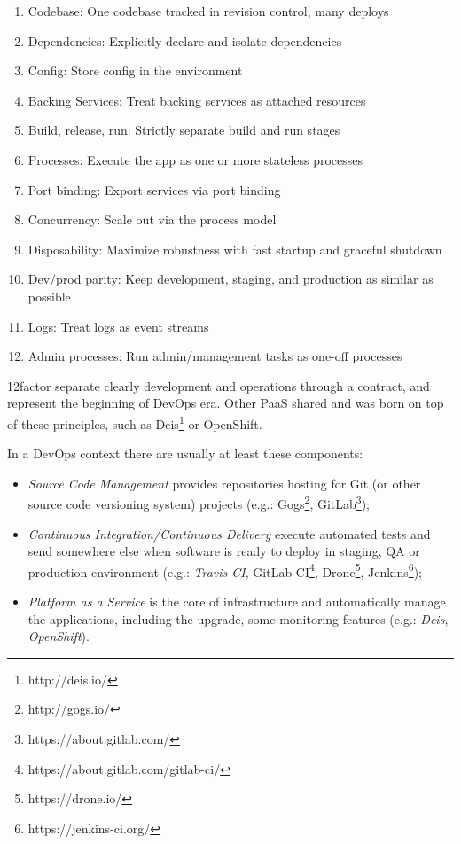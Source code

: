 \begin{enumerate}
\item Codebase:  One codebase tracked in revision control, many deploys
\item Dependencies:  Explicitly declare and isolate dependencies
\item Config: Store config in the environment
\item Backing Services:  Treat backing services as attached resources
\item Build, release, run:  Strictly separate build and run stages
\item Processes:  Execute the app as one or more stateless processes
\item Port binding:  Export services via port binding
\item Concurrency:  Scale out via the process model
\item Disposability:  Maximize robustness with fast startup and graceful shutdown
\item Dev/prod parity:  Keep development, staging, and production as similar as possible
\item Logs:  Treat logs as event streams
\item Admin processes:  Run admin/management tasks as one-off processes
\end{enumerate}

12factor separate clearly development and operations through a contract, and represent the beginning of DevOps era. Other PaaS shared and was born on top of these principles, such as Deis\footnote{http://deis.io/} or OpenShift.

In a DevOps context there are usually at least these components:

\begin{itemize}
\item \textit{Source Code Management} provides repositories hosting for Git   (or other source code versioning system) projects (e.g.: Gogs\footnote{http://gogs.io/},   GitLab\footnote{https://about.gitlab.com/});
\item \textit{Continuous Integration/Continuous Delivery} execute automated   tests and send somewhere else when software is ready to deploy in   staging, QA or production environment (e.g.: \textit{Travis CI},  GitLab CI\footnote{https://about.gitlab.com/gitlab-ci/}, Drone\footnote{https://drone.io/}, Jenkins\footnote{https://jenkins-ci.org/});
\item \textit{Platform as a Service} is the core of infrastructure and
  automatically manage the applications, including the upgrade, some
  monitoring features (e.g.: \textit{Deis}, \textit{OpenShift}).
\end{itemize}

